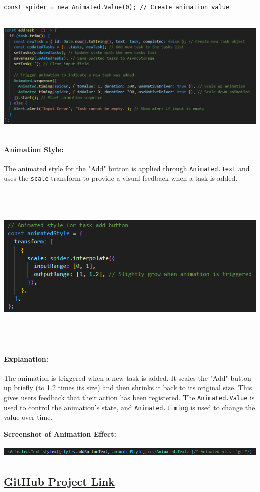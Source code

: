 \documentclass[12pt]{article}
\begin{document}
\begin{verbatim}
const spider = new Animated.Value(0); // Create animation value
\end{verbatim}
\begin{center}
    \includegraphics[width=\textwidth, height=6cm]{images/animation1.png} 
\end{center}

\paragraph{Animation Style:}
The animated style for the "Add" button is applied through \texttt{Animated.Text} and uses the \texttt{scale} transform to provide a visual feedback when a task is added.
\begin{center}
    \includegraphics[width=\textwidth, height=8cm]{images/animated2.png} 
\end{center}
\paragraph{Explanation:}
The animation is triggered when a new task is added. It scales the "Add" button up briefly (to 1.2 times its size) and then shrinks it back to its original size. This gives users feedback that their action has been registered. The \texttt{Animated.Value} is used to control the animation’s state, and \texttt{Animated.timing} is used to change the value over time.

\textbf{Screenshot of Animation Effect:}
\begin{center}
    \includegraphics[width=1\textwidth, height=0.6cm]{images/animated3.png} 
\end{center}

\begin{center}
    \section*{ \href{https://github.com/DeeapakSarun/ReactNativeApp.git}{GitHub Project Link}}
\end{center}
\end{document}
